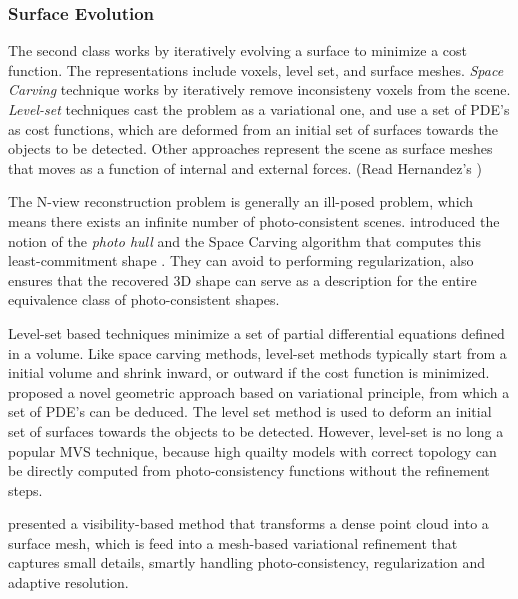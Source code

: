 \subsubsection{Surface Evolution}

The second class works by iteratively evolving a surface to minimize a cost function. The representations include voxels, level set, and surface meshes. \textit{Space Carving} technique works by iteratively remove inconsisteny voxels from the scene. \textit{Level-set} techniques cast the problem as a variational one, and use a set of PDE's as cost functions, which are deformed from an initial set of surfaces towards the objects to be detected. Other approaches represent the scene as surface meshes that moves as a function of internal and external forces. (Read Hernandez's \cite{esteban2004silhouette})

The N-view reconstruction problem is generally an ill-posed problem, which means there exists an infinite number of photo-consistent scenes. \citeauthor{kutulakos2000theory} introduced the notion of the \textit{photo hull} and the Space 
Carving algorithm that computes this least-commitment shape \cite{marr1982vision}. They can avoid to performing regularization, also ensures that the recovered 3D shape can serve as a description for the entire equivalence class of photo-consistent shapes.

Level-set based techniques minimize a set of partial differential equations defined in a volume. Like space carving methods, level-set methods typically start from a initial volume and shrink inward, or outward if the cost function is minimized. \citeauthor{faugeras2002variational} proposed a novel geometric approach based on variational principle, from which a set of PDE's can be deduced. The level set method is used to deform an initial set of surfaces towards the objects to be detected. However, level-set is no long a popular MVS technique, because high quailty models with correct topology can be directly computed from photo-consistency functions without the refinement steps.

\citeauthor{hiep2009towards} presented a visibility-based method that transforms a dense point cloud into a surface mesh, which is feed into a mesh-based variational refinement that captures small details, smartly handling photo-consistency, regularization and adaptive resolution.



